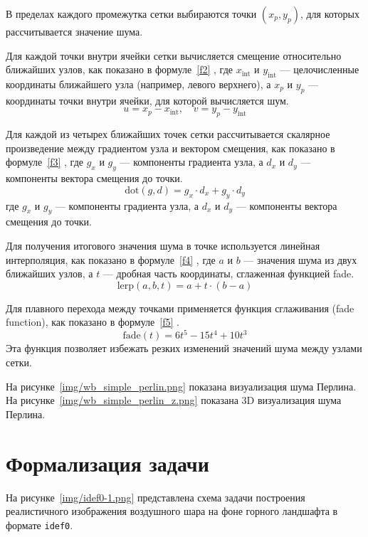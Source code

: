 В пределах каждого промежутка сетки выбираются точки $(x_p, y_p)$, для которых рассчитывается значение шума.

Для каждой точки внутри ячейки сетки вычисляется смещение относительно ближайших узлов, как показано в формуле~\ref{f2} \cite{real_time}, где $x_{\text{int}}$ и $y_{\text{int}}$ — целочисленные координаты ближайшего узла (например, левого верхнего), а $x_p$ и $y_p$ — координаты точки внутри ячейки, для которой вычисляется шум.
\begin{equation}
u = x_p - x_{\text{int}}, \quad v = y_p - y_{\text{int}}
\label{f2}
\end{equation}


Для каждой из четырех ближайших точек сетки рассчитывается скалярное произведение между градиентом узла и вектором смещения, как показано в формуле~\ref{f3} \cite{real_time}, где $g_x$ и $g_y$ — компоненты градиента узла, а $d_x$ и $d_y$ — компоненты вектора смещения до точки.
\begin{equation}
\text{dot}(g, d) = g_x \cdot d_x + g_y \cdot d_y
\label{f3}
\end{equation}
где $g_x$ и $g_y$ — компоненты градиента узла, а $d_x$ и $d_y$ — компоненты вектора смещения до точки.

Для получения итогового значения шума в точке используется линейная интерполяция, как показано в формуле~\ref{f4} \cite{real_time}, где $a$ и $b$ — значения шума из двух ближайших узлов, а $t$ — дробная часть координаты, сглаженная функцией fade.
\begin{equation}
\text{lerp}(a, b, t) = a + t \cdot (b - a)
\label{f4}
\end{equation}


Для плавного перехода между точками применяется функция сглаживания (fade function), как показано в формуле~\ref{f5} \cite{real_time}.
\begin{equation}
\text{fade}(t) = 6t^5 - 15t^4 + 10t^3
\label{f5}
\end{equation}
Эта функция позволяет избежать резких изменений значений шума между узлами сетки.

На рисунке~\ref{img/wb_simple_perlin.png} показана визуализация шума Перлина. На рисунке~\ref{img/wb_simple_perlin_z.png} показана 3D визуализация шума Перлина.



\section{Формализация задачи}
На рисунке~\ref{img/idef0-1.png} представлена схема задачи построения реалистичного изображения воздушного шара на фоне горного ландшафта в формате \texttt{idef0}.


